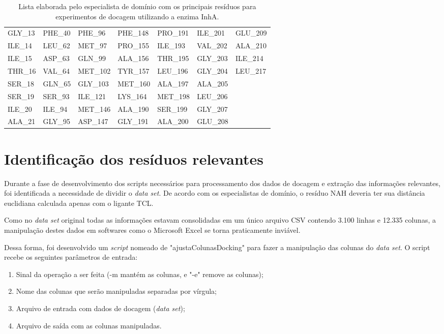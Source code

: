 \begin{table}[h]
\caption{Lista elaborada pelo especialista de domínio com os principais resíduos para experimentos de docagem utilizando a enzima InhA.}
\label{tab:listaOsmar}
\centering
\begin{tabular}{@{}lllllll@{}}
GLY\_13	&	PHE\_40 &	PHE\_96	&	PHE\_148 &	PRO\_191 &	ILE\_201 &	GLU\_209 		\\
ILE\_14	&	LEU\_62 &	MET\_97	&	PRO\_155 &	ILE\_193 &	VAL\_202 &	ALA\_210 		\\
ILE\_15	&	ASP\_63 &	GLN\_99	&	ALA\_156 &	THR\_195 &	GLY\_203 &	ILE\_214 		\\
THR\_16	&	VAL\_64 &	MET\_102 &	TYR\_157 &	LEU\_196 &	GLY\_204 &	LEU\_217 		\\
SER\_18	&	GLN\_65 &	GLY\_103 &	MET\_160 &	ALA\_197 &	ALA\_205 &					\\
SER\_19	&	SER\_93 &	ILE\_121 &	LYS\_164 &	MET\_198 &	LEU\_206 &					\\
ILE\_20	&	ILE\_94	&	MET\_146 &	ALA\_190 &	SER\_199 &	GLY\_207 &					\\
ALA\_21 &	GLY\_95	&	ASP\_147 &	GLY\_191 &	ALA\_200 &	GLU\_208 &					\\ 
\end{tabular}
\end{table}

\section{Identificação dos resíduos relevantes}
\label{sec:IdentificacaoDosResiduosRelevantes}

Durante a fase de desenvolvimento dos scripts necessários para processamento dos dados de docagem e extração das informações relevantes, foi identificada a necessidade de dividir o \emph{data set}. De acordo com os especialistas de domínio, o resíduo NAH deveria ter sua distância euclidiana calculada apenas com o ligante TCL.

Como no \emph{data set} original todas as informações estavam consolidadas em um único arquivo CSV contendo 3.100 linhas e 12.335 colunas, a manipulação destes dados em softwares como o Microsoft Excel se torna praticamente inviável.

Dessa forma, foi desenvolvido um \emph{script} nomeado de "ajustaColunasDocking" para fazer a manipulação das colunas do \emph{data set}. O script recebe os seguintes parâmetros de entrada:

\begin{enumerate}
	\item Sinal da operação a ser feita (-m mantém as colunas, e "-e" remove as colunas);
	\item Nome das colunas que serão manipuladas separadas por vírgula;
	\item Arquivo de entrada com dados de docagem (\emph{data set});
	\item Arquivo de saída com as colunas manipuladas.
\end{enumerate}

